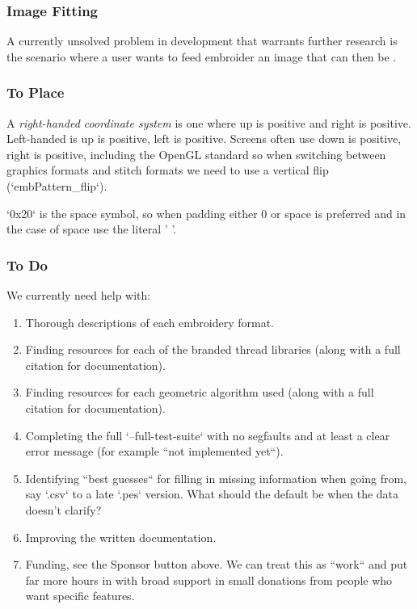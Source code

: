 \documentclass[a4paper, 11pt]{report}
\begin{document}
\subsubsection{Image Fitting}

A currently unsolved problem in development that warrants further research is
the scenario where a user wants to feed embroider an image that can then be .

\subsubsection{To Place}

A \emph{right-handed coordinate system} is one where up is positive and right is
positive. Left-handed is up is positive, left is positive. Screens often use
down is positive, right is positive, including the OpenGL standard so when
switching between graphics formats and stitch formats we need to use a vertical
flip (`embPattern\_flip`).

`0x20` is the space symbol, so when padding either 0 or space is preferred and
in the case of space use the literal ' '.

\subsubsection{To Do}

We currently need help with:

\begin{enumerate}
\item Thorough descriptions of each embroidery format.
\item Finding resources for each of the branded thread libraries
   (along with a full citation for documentation).
\item Finding resources for each geometric algorithm used (along with a
   full citation for documentation).
\item Completing the full `--full-test-suite`  with no segfaults and at least
   a clear error message (for example ``not implemented yet``).
\item Identifying ``best guesses`` for filling in missing information when going
   from, say `.csv` to a late `.pes` version. What should the default be when
   the data doesn't clarify?
\item Improving the written documentation.
\item Funding, see the Sponsor button above. We can treat this as ``work`` and put
   far more hours in with broad support in small donations from people who
   want specific features.
\end{enumerate}
\end{document}
